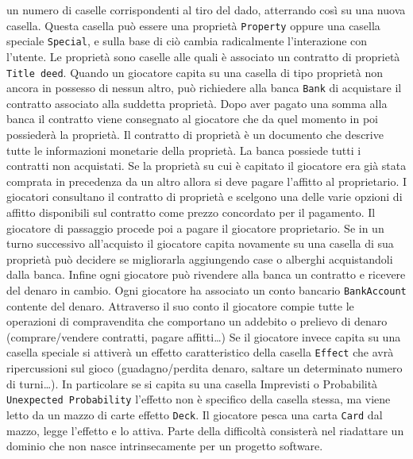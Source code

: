 un numero di caselle corrispondenti al tiro del dado, atterrando così su una nuova casella. 
Questa casella può essere una proprietà \texttt{Property} oppure una casella speciale \texttt{Special}, 
e sulla base di ciò cambia radicalmente l’interazione con l’utente.\newline
Le proprietà sono caselle alle quali è associato un contratto di proprietà \texttt{Title deed}. 
Quando un giocatore capita su una casella di tipo proprietà non ancora in possesso di nessun altro, può richiedere alla banca \texttt{Bank} di acquistare
il contratto associato alla suddetta proprietà.
Dopo aver pagato una somma alla banca il contratto viene consegnato al giocatore che da quel momento in poi possiederà la proprietà.
Il contratto di proprietà è un documento che descrive tutte le informazioni monetarie della proprietà.
La banca possiede tutti i contratti non acquistati.\newline
Se la proprietà su cui è capitato il giocatore era già stata comprata in precedenza da un altro allora si 
deve pagare l'affitto al proprietario. I giocatori consultano il contratto di proprietà e scelgono una delle varie opzioni di affitto
disponibili sul contratto come prezzo concordato per il pagamento. Il giocatore di passaggio procede poi a pagare il giocatore proprietario.\newline
Se in un turno successivo all'acquisto il giocatore capita novamente su una casella di sua proprietà può decidere se migliorarla aggiungendo case 
o alberghi acquistandoli dalla banca.
Infine ogni giocatore può rivendere alla banca un contratto e ricevere del denaro in cambio.
Ogni giocatore ha associato un conto bancario  \texttt{BankAccount} contente del denaro. Attraverso il suo conto
il giocatore compie tutte le operazioni di compravendita che comportano un addebito o prelievo di denaro (comprare/vendere contratti, pagare affitti\dots)\newline
Se il giocatore invece capita su una casella speciale si attiverà un effetto caratteristico della casella \texttt{Effect}
che avrà ripercussioni sul gioco 
(guadagno/perdita denaro, saltare un determinato numero di turni\dots). 
In particolare se si capita su una casella Imprevisti o Probabilità \texttt{Unexpected Probability} l'effetto non 
è specifico della casella stessa, ma viene letto da un mazzo di carte effetto \texttt{Deck}. 
Il giocatore pesca una carta \texttt{Card} dal mazzo, legge l'effetto e lo attiva.\smallskip\newline
Parte della difficoltà consisterà nel riadattare un dominio che non nasce intrinsecamente per un progetto software.
